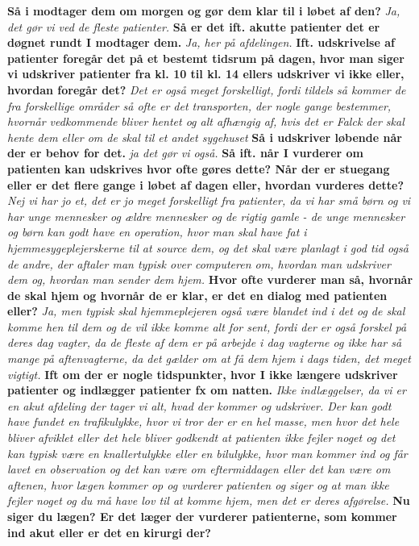 \textbf{Så i modtager dem om morgen og gør dem klar til i løbet af den? }
\textit{Ja, det gør vi ved de fleste patienter.}
\textbf{Så er det ift. akutte patienter det er døgnet rundt I modtager dem.}
\textit{Ja, her på afdelingen. }
\textbf{Ift. udskrivelse af patienter foregår det på et bestemt tidsrum på dagen, hvor man siger vi udskriver patienter fra kl. 10 til kl. 14 ellers udskriver vi ikke eller, hvordan foregår det?}
\textit{Det er også meget forskelligt, fordi tildels så kommer de fra forskellige områder så ofte er det transporten, der nogle gange bestemmer, hvornår vedkommende bliver hentet og alt afhængig af, hvis det er Falck der skal hente dem eller om de skal til et andet sygehuset }
\textbf{Så i udskriver løbende når der er behov for det.}
\textit{ja det gør vi også.}
\textbf{Så ift. når I vurderer om patienten kan udskrives hvor ofte gøres dette? Når der er stuegang eller er det flere gange i løbet af dagen eller, hvordan vurderes dette?}
\textit{Nej vi har jo et, det er jo meget forskelligt fra patienter, da vi har små børn og vi har unge mennesker og ældre mennesker og de rigtig gamle - de unge mennesker og børn kan godt have en operation, hvor man skal have fat i hjemmesygeplejerskerne til at source dem, og det skal være planlagt i god tid også de andre, der aftaler man typisk over computeren om, hvordan man udskriver dem og, hvordan man sender dem hjem. }
\textbf{Hvor ofte vurderer man så, hvornår de skal hjem og hvornår de er klar, er det en dialog med patienten eller?}
\textit{ Ja, men typisk skal hjemmeplejeren også være blandet ind i det og de skal komme hen til dem og de vil ikke komme alt for sent, fordi der er også forskel på deres dag vagter, da de fleste af dem er på arbejde i dag vagterne og ikke har så mange på aftenvagterne, da det gælder om at få dem hjem i dags tiden, det meget vigtigt.}
\textbf{ Ift om der er nogle tidspunkter, hvor I ikke længere udskriver patienter og indlægger patienter fx om natten. }
\textit{Ikke indlæggelser, da vi er en akut afdeling der tager vi alt, hvad der kommer og udskriver. Der kan godt have fundet en trafikulykke, hvor vi tror der er en hel masse, men hvor det hele bliver afviklet eller det hele bliver godkendt at patienten ikke fejler noget og det kan typisk være en knallertulykke eller en bilulykke, hvor man kommer ind og får lavet en observation og det kan være om eftermiddagen eller det kan være om aftenen, hvor lægen kommer op og vurderer patienten og siger og at man ikke fejler noget og du må have lov til at komme hjem, men det er deres afgørelse.}
\textbf{ Nu siger du lægen? Er det læger der vurderer patienterne, som kommer ind akut eller er det en kirurgi der?}
